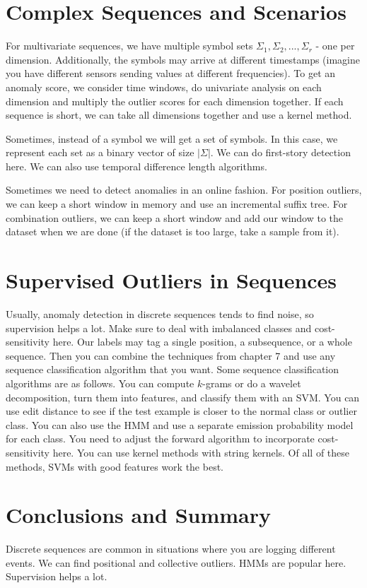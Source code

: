 \documentclass[a4paper]{article}
\begin{document}
\section{Complex Sequences and Scenarios}
For multivariate sequences, we have multiple symbol sets $\Sigma_1, \Sigma_2,
..., \Sigma_r$ - one per dimension. Additionally, the symbols may arrive at
different timestamps (imagine you have different sensors sending values
at different frequencies). To get an anomaly score, we consider time windows,
do univariate analysis on each dimension and multiply the outlier scores
for each dimension together. If each sequence is short, we can take all
dimensions together and use a kernel method.

Sometimes, instead of a symbol we will get a set of symbols. In this case, we
represent each set as a binary vector of size $|\Sigma|$. We can do first-story
detection here. We can also use temporal difference length algorithms.

Sometimes we need to detect anomalies in an online fashion. For position
outliers, we can keep a short window in memory and use an incremental
suffix tree. For combination outliers, we can keep a short window and add our
window to the dataset when we are done (if the dataset is too large, take
a sample from it).

\section{Supervised Outliers in Sequences}
Usually, anomaly detection in discrete sequences tends to find noise, so
supervision helps a lot. Make sure to deal with imbalanced classes and
cost-sensitivity here. Our labels may tag a single position, a subsequence, or
a whole sequence. Then you can combine the techniques from chapter 7 and use
any sequence classification algorithm that you want. Some sequence
classification algorithms are as follows. You can compute $k$-grams or
do a wavelet decomposition, turn them into features, and classify them with an
SVM. You can use edit distance to see if the test example is closer to the
normal class or outlier class. You can also use the HMM and use a separate
emission probability model for each class. You need to adjust the forward
algorithm to incorporate cost-sensitivity here. You can use kernel methods
with string kernels. Of all of these methods, SVMs with good features work
the best.

\section{Conclusions and Summary}
Discrete sequences are common in situations where you are logging different
events. We can find positional and collective outliers. HMMs are popular here.
Supervision helps a lot.
\end{document}

